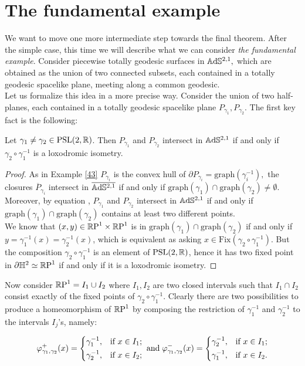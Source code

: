 \section{The fundamental example} We want to move one more intermediate step towards the final theorem. After the simple case, this time we will describe what we can consider \textit{the fundamental example}. Consider piecewise totally geodesic surfaces in $\A^{2,1},$ which are obtained as the union of two connected subsets, each contained in a totally geodesic spacelike plane, meeting along a common geodesic. \\
Let us formalize this idea in a more precise way. Consider the union of two half-planes, each contained in a totally geodesic spacelike plane $P_{\gamma_1},P_{\gamma_2}$. The first key fact is the following:

\begin{lemma}\label{Mati}
    Let $\gamma_1\neq\gamma_2\in\PSL$. Then $P_{\gamma_1}$ and $P_{\gamma_2}$ intersect in $\A^{2,1}$ if and only if $\gamma_2\circ{\gamma_1^{-1}}$ is a loxodromic isometry. 
\end{lemma}
\begin{proof}
    As in Example \ref{43} $P_{\gamma_i}$ is the convex hull of $\partial P_{\gamma_i}=\text{graph}(\gamma_i^{-1}),$ the closures $\overline{P}_{\gamma_i}$  intersect in $\overline{\A^{2,1}}$ if and only if $\text{graph}(\gamma_1)\cap\text{graph}(\gamma_2)\neq\emptyset$. Moreover, by equation , $P_{\gamma_1}$ and $P_{\gamma_2}$ intersect in $\A^{2,1}$ if and only if $\text{graph}(\gamma_1)\cap\text{graph}(\gamma_2)$ contains at least two different points. \\
    We know that $(x,y)\in\T$ is in $\text{graph}(\gamma_1)\cap\text{graph}(\gamma_2)$ if and only if $y=\gamma_1^{-1}(x)=\gamma_2^{-1}(x)$, which is equivalent as asking $x\in\text{Fix}(\gamma_2\circ\gamma_1^{-1})$. But the composition $\gamma_2\circ\gamma_1^{-1}$ is an element of $\PSL$, hence it has two fixed point in $\partial\H^2\simeq\S$ if and only if it is a loxodromic isometry.
\end{proof}

Now consider $\S=I_1\cup I_2$ where $I_1,I_2$ are two closed intervals such that $I_1\cap I_2$ consist exactly of the fixed points of $\gamma_2\circ\gamma_1^{-1}.$ Clearly there are two possibilities to produce a homeomorphism of $\S$ by composing the restriction of $\gamma_1^{-1}$ and $\gamma_2^{-1}$ to the intervals $I_j$'s, namely: 

\begin{equation}
    \varphi_{\gamma_1,\gamma_2}^+(x) = \begin{dcases}
        \gamma_1^{-1}, & \text{if } x \in I_1; \\
        \gamma_2^{-1}, & \text{if } x \in I_2;
    \end{dcases}
    \;\text{and}\;
    \varphi^-_{\gamma_1,\gamma_2}(x) = \begin{dcases}
        \gamma_2^{-1}, & \text{if } x \in I_1 ;\\
        \gamma_1^{-1} , & \text{if } x \in I_2.
    \end{dcases}
    \end{equation}
    
